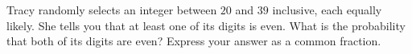 Tracy randomly selects an integer between $20$ and $39$ inclusive, each equally likely. She tells you that at least one of its digits is even. What is the probability that both of its digits are even? Express your answer as a common fraction.
